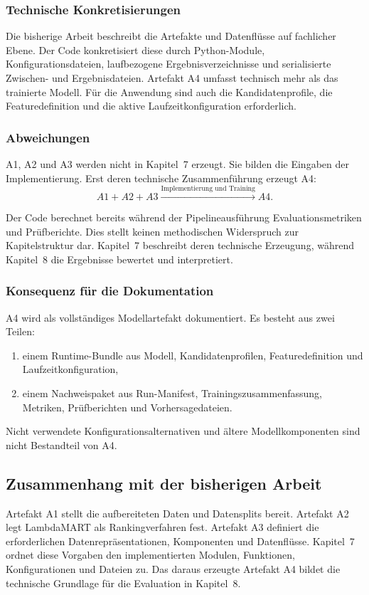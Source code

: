 \subsubsection*{Technische Konkretisierungen} 

Die bisherige Arbeit beschreibt die Artefakte und Datenflüsse auf fachlicher Ebene. Der Code konkretisiert diese durch Python-Module, Konfigurationsdateien, laufbezogene Ergebnisverzeichnisse und serialisierte Zwischen- und Ergebnisdateien. 
Artefakt A4 umfasst technisch mehr als das trainierte Modell. Für die Anwendung sind auch die Kandidatenprofile, die Featuredefinition und die aktive Laufzeitkonfiguration erforderlich. 

\subsubsection*{Abweichungen} 

A1, A2 und A3 werden nicht in Kapitel~7 erzeugt. Sie bilden die Eingaben der Implementierung. Erst deren technische Zusammenführung erzeugt A4: 
\begin{equation} A1 + A2 + A3 \xrightarrow{\text{Implementierung und Training}} A4. 
    \label{eq:artefaktueberfuehrung_a4} 
\end{equation} 

Der Code berechnet bereits während der Pipelineausführung Evaluationsmetriken und Prüfberichte. Dies stellt keinen methodischen Widerspruch zur Kapitelstruktur dar. Kapitel~7 beschreibt deren technische Erzeugung, 
während Kapitel~8 die Ergebnisse bewertet und interpretiert. \subsubsection*{Konsequenz für die Dokumentation} A4 wird als vollständiges Modellartefakt dokumentiert. 
Es besteht aus zwei Teilen: 
\begin{enumerate} 
    \item einem Runtime-Bundle aus Modell, Kandidatenprofilen, Featuredefinition und Laufzeitkonfiguration, 
    \item einem Nachweispaket aus Run-Manifest, Trainingszusammenfassung, Metriken, Prüfberichten und Vorhersagedateien. 
\end{enumerate} 

Nicht verwendete Konfigurationsalternativen und ältere Modellkomponenten sind nicht Bestandteil von A4. 

\subsection{Zusammenhang mit der bisherigen Arbeit} 
\label{subsec:zusammenhang_artefaktueberfuehrung} 
Artefakt A1 stellt die aufbereiteten Daten und Datensplits bereit. Artefakt A2 legt LambdaMART als Rankingverfahren fest. Artefakt A3 definiert die erforderlichen Datenrepräsentationen, 
Komponenten und Datenflüsse. Kapitel~7 ordnet diese Vorgaben den implementierten Modulen, Funktionen, Konfigurationen und Dateien zu. Das daraus erzeugte Artefakt A4 bildet die technische Grundlage für die Evaluation in Kapitel~8. 

